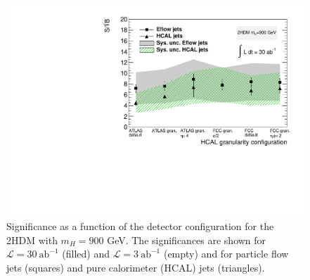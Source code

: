 \begin{figure}
	\centering
	\includegraphics[width=0.5\linewidth]{./Figures/SSBvsGran_2HDM.pdf}
	\caption{Significance as a function of the detector configuration for the 2HDM with $m_H=900$ GeV. The significances are shown for $\mathcal{L}=30~\text{ab}^{-1}$ (filled) and $\mathcal{L}=3~\text{ab}^{-1}$ (empty) and for particle flow jets (squares) and pure calorimeter (HCAL) jets (triangles).}
	\label{fig:SSBvsGran_2HDM}
\end{figure}

